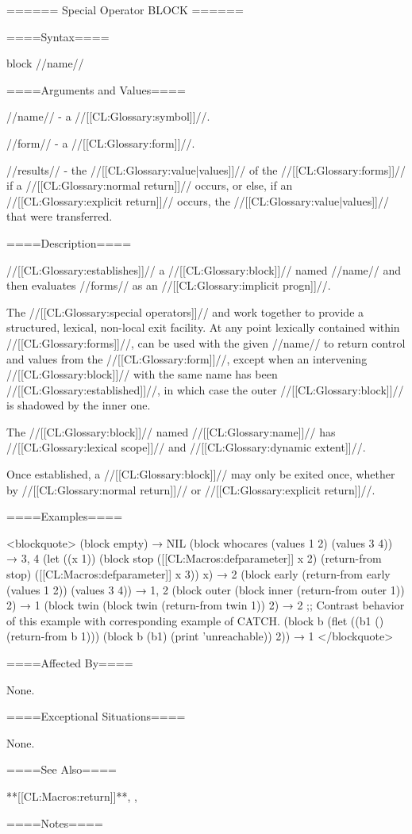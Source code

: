 ====== Special Operator BLOCK ======

====Syntax====

\DefspecWithValues block {//name// } {}

====Arguments and Values====

//name// - a //[[CL:Glossary:symbol]]//.

//form// - a //[[CL:Glossary:form]]//.

//results// - the //[[CL:Glossary:value|values]]// of the //[[CL:Glossary:forms]]// if a //[[CL:Glossary:normal return]]// occurs, or else, if an //[[CL:Glossary:explicit return]]// occurs, the //[[CL:Glossary:value|values]]// that were transferred.

====Description====

 //[[CL:Glossary:establishes]]// a //[[CL:Glossary:block]]// named //name// and then evaluates //forms// as an //[[CL:Glossary:implicit progn]]//.

The //[[CL:Glossary:special operators]]//  and  work together to provide a structured, lexical, non-local exit facility. At any point lexically contained within //[[CL:Glossary:forms]]//,  can be used with the given //name// to return control and values from the  //[[CL:Glossary:form]]//, except when an intervening //[[CL:Glossary:block]]// with the same name has been //[[CL:Glossary:established]]//, in which case the outer //[[CL:Glossary:block]]// is shadowed by the inner one.

The //[[CL:Glossary:block]]// named //[[CL:Glossary:name]]// has //[[CL:Glossary:lexical scope]]// and //[[CL:Glossary:dynamic extent]]//.

Once established, a //[[CL:Glossary:block]]// may only be exited once, whether by //[[CL:Glossary:normal return]]// or //[[CL:Glossary:explicit return]]//.

====Examples====

<blockquote> (block empty) → NIL (block whocares (values 1 2) (values 3 4)) → 3, 4 (let ((x 1)) (block stop ([[CL:Macros:defparameter]] x 2) (return-from stop) ([[CL:Macros:defparameter]] x 3)) x) → 2 (block early (return-from early (values 1 2)) (values 3 4)) → 1, 2 (block outer (block inner (return-from outer 1)) 2) → 1 (block twin (block twin (return-from twin 1)) 2) → 2 ;; Contrast behavior of this example with corresponding example of CATCH. (block b (flet ((b1 () (return-from b 1))) (block b (b1) (print 'unreachable)) 2)) → 1 </blockquote>

====Affected By====

None.

====Exceptional Situations====

None.

====See Also====

**[[CL:Macros:return]]**, , {\secref\Evaluation}

====Notes====

